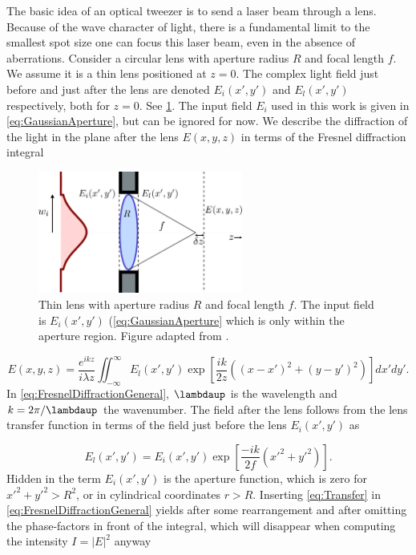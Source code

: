 The basic idea of an optical tweezer is to send a laser beam through a lens.
Because of the wave character of light, there is a fundamental limit to the smallest spot size one can focus this laser beam, even in the absence of aberrations.
Consider a circular lens with aperture radius $R$ and focal length $f$.
We assume it is a thin lens positioned at $z=0$.
The complex light field just before and just after the lens are denoted $E_i(x',y')$ and $E_l(x',y')$ respectively, both for $z=0$.
See \cref{fig:LensAperture}.
The input field $E_i$ used in this work is given in \cref{eq:GaussianAperture}, but can be ignored for now.
We describe the diffraction of the light in the plane after the lens $E(x,y,z)$ in terms of the Fresnel diffraction integral \cite{Goodman2005}

\begin{figure}
	\centering
	\includegraphics[width=0.6\textwidth]{figures/lens.pdf}
	\caption{Thin lens with aperture radius $R$ and focal length $f$. 
	The input field is $E_i(x',y')$ (\cref{eq:GaussianAperture} which is only within the aperture region. Figure adapted from \cite{Leseleuc2018,Gu2000}.}
	\label{fig:LensAperture}
\end{figure}

\begin{equation}\label{eq:FresnelDiffractionGeneral}
    E(x,y,z) = 
    \frac{e^{ikz}}{i \lambda z} \iint_{-\infty}^{\infty} E_l(x',y') \exp{\left[\frac{ik}{2z}\left((x-x')^2+(y-y')^2\right)\right]} dx'dy'.
\end{equation}
In \cref{eq:FresnelDiffractionGeneral}, $\lambdaup$ is the wavelength and $k=2\pi/\lambdaup$ the wavenumber.
The field after the lens follows from the lens transfer function in terms of the field just before the lens $E_i(x',y')$ as \cite{Goodman2005}

\begin{equation}\label{eq:Transfer}
	E_l(x',y')= E_i(x',y') \exp{
		\left[\frac{-i k}{2 f}(x'^2+y'^2)\right].
	}
\end{equation}
Hidden in the term $E_i(x',y')$ is the aperture function, which is zero for $x'^2+y'^2>R^2$, or in cylindrical coordinates $r>R$.
Inserting \cref{eq:Transfer} in \cref{eq:FresnelDiffractionGeneral} yields after some rearrangement and after omitting the phase-factors in front of the integral, which will disappear when computing the intensity $I=|E|^2$ anyway \cite{Gu2000}

